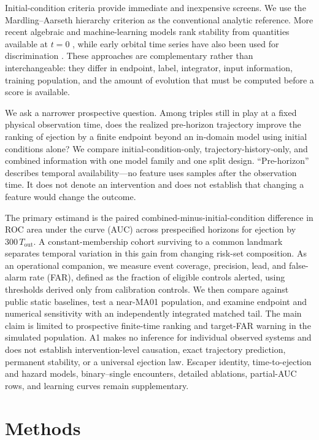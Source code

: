 \documentclass[linenumbers,twocolumn]{aastex702}
\newcommand{\Tout}{T_{\mathrm{out}}}
\begin{document}
Initial-condition criteria provide immediate and inexpensive screens. We use the Mardling--Aarseth hierarchy criterion \citep[MA01;][]{MardlingAarseth2001} as the conventional analytic reference. More recent algebraic and machine-learning models rank stability from quantities available at $t=0$ \citep{Tory2022,Vynatheya2022,Vynatheya2023}, while early orbital time series have also been used for discrimination \citep{LalandeTrani2022}. These approaches are complementary rather than interchangeable: they differ in endpoint, label, integrator, input information, training population, and the amount of evolution that must be computed before a score is available.

We ask a narrower prospective question. Among triples still in play at a fixed physical observation time, does the realized pre-horizon trajectory improve the ranking of ejection by a finite endpoint beyond an in-domain model using initial conditions alone? We compare initial-condition-only, trajectory-history-only, and combined information with one model family and one split design. ``Pre-horizon'' describes temporal availability---no feature uses samples after the observation time. It does not denote an intervention and does not establish that changing a feature would change the outcome.

The primary estimand is the paired combined-minus-initial-condition difference in ROC area under the curve (AUC) across prespecified horizons for ejection by $300\,\Tout$. A constant-membership cohort surviving to a common landmark separates temporal variation in this gain from changing risk-set composition. As an operational companion, we measure event coverage, precision, lead, and false-alarm rate (FAR), defined as the fraction of eligible controls alerted, using thresholds derived only from calibration controls. We then compare against public static baselines, test a near-MA01 population, and examine endpoint and numerical sensitivity with an independently integrated matched tail. The main claim is limited to prospective finite-time ranking and target-FAR warning in the simulated population. A1 makes no inference for individual observed systems and does not establish intervention-level causation, exact trajectory prediction, permanent stability, or a universal ejection law. Escaper identity, time-to-ejection and hazard models, binary--single encounters, detailed ablations, partial-AUC rows, and learning curves remain supplementary.

\section{Methods}\label{sec:methods}
\end{document}
